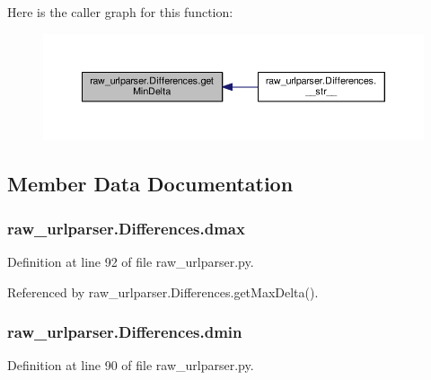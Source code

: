 Here is the caller graph for this function\-:
\nopagebreak
\begin{figure}[H]
\begin{center}
\leavevmode
\includegraphics[width=350pt]{classraw__urlparser_1_1_differences_ab80ae6b8351413164c04cda59d316a31_icgraph}
\end{center}
\end{figure}




\subsection{Member Data Documentation}
\hypertarget{classraw__urlparser_1_1_differences_ad2b06158b655136bc7743dc6ac8d1e2a}{
\subsubsection[{dmax}]{\setlength{\rightskip}{0pt plus 5cm}raw\-\_\-urlparser.\-Differences.\-dmax}}\label{classraw__urlparser_1_1_differences_ad2b06158b655136bc7743dc6ac8d1e2a}


Definition at line 92 of file raw\-\_\-urlparser.\-py.



Referenced by raw\-\_\-urlparser.\-Differences.\-get\-Max\-Delta().

\hypertarget{classraw__urlparser_1_1_differences_af8457a8e542de086595e7fbbffdf713c}{
\subsubsection[{dmin}]{\setlength{\rightskip}{0pt plus 5cm}raw\-\_\-urlparser.\-Differences.\-dmin}}\label{classraw__urlparser_1_1_differences_af8457a8e542de086595e7fbbffdf713c}


Definition at line 90 of file raw\-\_\-urlparser.\-py.



